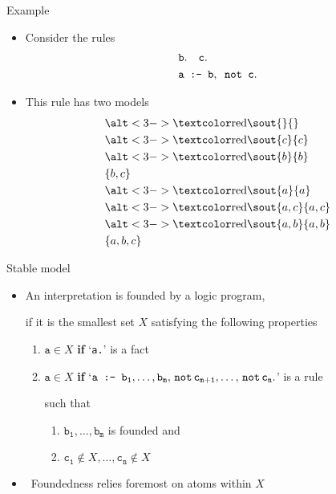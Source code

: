 \begin{frame}[c]{Example}
  \begin{itemize}
  \item Consider the rules
    \begin{align*}
      &{\tt b.\quad   c.}\\
      &{\tt a\texttt{ :- } b,\texttt{ not }c.}
    \end{align*}
  \item <2-> This rule has two models
    \begin{align*}
      &\STROUT{3-}{}\\
      &\STROUT{3-}{c}\\
      &\STROUT{3-}{b}\\
      &\{b,c\}\\
      &\STROUT{3-}{a}\\
      &\STROUT{3-}{a,c}\\
      &\STROUT{3-}{a,b}\\
      &\{a,b,c\}
    \end{align*}
  \end{itemize}
\end{frame}
\begin{frame}[c]{Stable model}
  \begin{itemize}
  \item An interpretation is \alert{founded} by a logic program,
    \par\smallskip
    if it is the smallest set $X$ satisfying the following properties
    \smallskip
    \begin{enumerate}\normalsize
    \item $\texttt{a}\in X$\textbf{ if }`\texttt{a.}' is a fact
      \medskip
    \item $\texttt{a}\in X$\textbf{ if }`${\tt a\texttt{ :- } b_1,\dots,b_m,\,\texttt{not}\,c_{m+1},\dots,\,\texttt{not}\,c_n.}$' is a rule
      \par\smallskip
      such that
      \begin{enumerate}\normalsize
      \item $\mathtt{b_1},\dots,\mathtt{b_m}$ is founded and
      \item $\mathtt{c_1}\notin X,\dots,\mathtt{c_n}\notin X$
      \end{enumerate}
    \end{enumerate}
    \medskip
  \item<2->  \ Foundedness relies foremost on atoms within $X$

  \end{itemize}
\end{frame}
